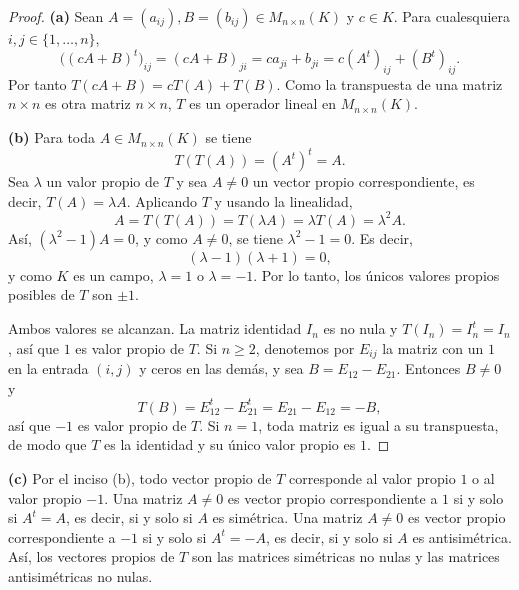 \documentclass[12pt,a4paper]{article}
\begin{document}
    \begin{proof}
        \textbf{(a)} Sean $A=(a_{ij}),B=(b_{ij})\in M_{n\times n}(K)$ y $c\in K$. Para cualesquiera $i,j\in\{1,\dots,n\}$,
        \begin{equation*}
            \big((cA+B)^{t}\big)_{ij}=(cA+B)_{ji}=ca_{ji}+b_{ji}=c(A^{t})_{ij}+(B^{t})_{ij}.
        \end{equation*}
        Por tanto $T(cA+B)=cT(A)+T(B)$. Como la transpuesta de una matriz $n\times n$ es otra matriz $n\times n$, $T$ es un operador lineal en $M_{n\times n}(K)$.

        \textbf{(b)} Para toda $A\in M_{n\times n}(K)$ se tiene
        \begin{equation*}
            T(T(A))=(A^{t})^{t}=A.
        \end{equation*}
        Sea $\lambda$ un valor propio de $T$ y sea $A\neq0$ un vector propio correspondiente, es decir, $T(A)=\lambda A$. Aplicando $T$ y usando la linealidad,
        \begin{equation*}
            A=T(T(A))=T(\lambda A)=\lambda T(A)=\lambda^{2}A.
        \end{equation*}
        Así, $(\lambda^{2}-1)A=0$, y como $A\neq0$, se tiene $\lambda^{2}-1=0$. Es decir,
        \begin{equation*}
            (\lambda-1)(\lambda+1)=0,
        \end{equation*}
        y como $K$ es un campo, $\lambda=1$ o $\lambda=-1$. Por lo tanto, los únicos valores propios posibles de $T$ son $\pm1$.

        Ambos valores se alcanzan. La matriz identidad $I_{n}$ es no nula y $T(I_{n})=I_{n}^{t}=I_{n}$, así que $1$ es valor propio de $T$. Si $n\geq2$, denotemos por $E_{ij}$ la matriz con un $1$ en la entrada $(i,j)$ y ceros en las demás, y sea $B=E_{12}-E_{21}$. Entonces $B\neq0$ y
        \begin{equation*}
            T(B)=E_{12}^{t}-E_{21}^{t}=E_{21}-E_{12}=-B,
        \end{equation*}
        así que $-1$ es valor propio de $T$. Si $n=1$, toda matriz es igual a su transpuesta, de modo que $T$ es la identidad y su único valor propio es $1$.
    \end{proof}

    \begin{solucion}
        \textbf{(c)} Por el inciso (b), todo vector propio de $T$ corresponde al valor propio $1$ o al valor propio $-1$. Una matriz $A\neq0$ es vector propio correspondiente a $1$ si y solo si $A^{t}=A$, es decir, si y solo si $A$ es simétrica. Una matriz $A\neq0$ es vector propio correspondiente a $-1$ si y solo si $A^{t}=-A$, es decir, si y solo si $A$ es antisimétrica. Así, los vectores propios de $T$ son las matrices simétricas no nulas y las matrices antisimétricas no nulas.
    \end{solucion}
\end{document}
